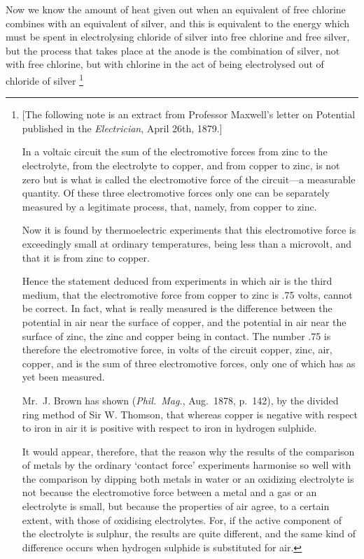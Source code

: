 \documentclass[12pt,oneside]{book}[2021/10/04]
\let\oldfootnote\footnote
\renewcommand\footnote[1]{%
\oldfootnote{\hspace{0.14em}#1}}
\newcommand{\¬}{\hphantom{0}}
\begin{document}
Now we know the amount of heat given out when an equivalent
of free chlorine combines with an equivalent of silver, and this is
equivalent to the energy which must be spent in electrolysing
chloride of silver into free chlorine and free silver, but the process
that takes place at the anode is the combination of silver, not with
free chlorine, but with chlorine in the act of being electrolysed out
of chloride of silver\footnote{\label{note:192}
[The following note is an extract from Professor Maxwell's letter on Potential
published in the \textit{Electrician}, April 26th, 1879.]

In a voltaic circuit the sum of the electromotive forces from zinc to the electrolyte,
from the electrolyte to copper, and from copper to zinc, is not zero but is what is called
the electromotive force of the circuit---a measurable quantity. Of these three electromotive
forces only one can be separately measured by a legitimate process, that,
namely, from copper to zinc.

Now it is found by thermoelectric experiments that this electromotive force is exceedingly
small at ordinary temperatures, being less than a microvolt, and that it is
from zinc to copper.

Hence the statement deduced from experiments in which air is the third medium,
that the electromotive force from copper to zinc is .75 volts, cannot be correct. In
fact, what is really measured is the difference between the potential in air near the
surface of copper, and the potential in air near the surface of zinc, the zinc and copper
being in contact. The number .75 is therefore the electromotive force, in volts of
the circuit copper, zinc, air, copper, and is the sum of three electromotive forces, only
one of which has as yet been measured.

Mr.\ J. Brown has shown (\textit{Phil.\ Mag.}, Aug.\ 1878, p.\ 142), by the divided ring method
of Sir W. Thomson, that whereas copper is negative with respect to iron in air it is
positive with respect to iron in hydrogen sulphide.

It would appear, therefore, that the reason why the results of the comparison of
metals by the ordinary `contact force' experiments harmonise so well with the comparison
by dipping both metals in water or an oxidizing electrolyte is not because the
electromotive force between a metal and a gas or an electrolyte is small, but because
the properties of air agree, to a certain extent, with those of oxidising electrolytes.
For, if the active component of the electrolyte is sulphur, the results are quite different,
and the same kind of difference occurs when hydrogen sulphide is substituted for air.

}
\end{document}
